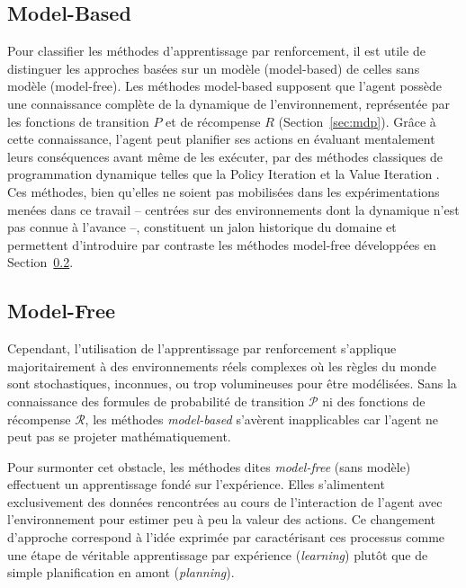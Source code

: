 \subsection{Model-Based}
\label{sec:model-based}

Pour classifier les méthodes d'apprentissage par renforcement, il est utile de distinguer les approches basées sur un modèle (model-based) de celles sans modèle (model-free). Les méthodes model-based supposent que l'agent possède une connaissance complète de la dynamique de 
l'environnement, représentée par les fonctions de transition $P$ et de récompense $R$ (Section~\ref{sec:mdp}). Grâce à cette connaissance, l'agent peut planifier ses actions en évaluant mentalement leurs conséquences avant même de les exécuter, par des méthodes classiques de programmation dynamique telles que la Policy Iteration et la Value Iteration \parencite{suttonReinforcementLearningIntroduction2018}. Ces méthodes, bien qu'elles ne soient pas mobilisées dans les expérimentations menées dans ce travail -- centrées sur des environnements dont la dynamique n'est pas connue à l'avance --, constituent un jalon historique du domaine et permettent d'introduire par contraste les méthodes model-free développées en Section~\ref{sec:model-free}.

\subsection{Model-Free}
\label{sec:model-free}
Cependant, l'utilisation de l'apprentissage par renforcement s'applique majoritairement à des environnements réels complexes où les règles du monde sont stochastiques, inconnues, ou trop volumineuses pour être modélisées. Sans la connaissance des formules de probabilité de transition $\mathcal{P}$ ni des fonctions de récompense $\mathcal{R}$, les méthodes \textit{model-based} s'avèrent inapplicables car l'agent ne peut pas se projeter mathématiquement.

Pour surmonter cet obstacle, les méthodes dites \textit{model-free} (sans modèle) effectuent un apprentissage fondé sur l'expérience. Elles s'alimentent exclusivement des données rencontrées au cours de l'interaction de l'agent avec l'environnement pour estimer peu à peu la valeur des actions. Ce changement d'approche correspond à l'idée exprimée par \textcite{silverLecturesReinforcementLearning2015} caractérisant ces processus comme une étape de véritable apprentissage par expérience (\textit{learning}) plutôt que de simple planification en amont (\textit{planning}).

